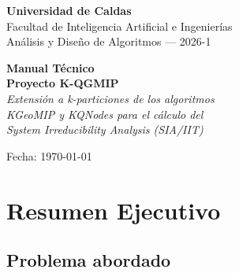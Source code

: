 \documentclass[11pt,letterpaper]{article}
\begin{document}
\begin{titlepage}
  \centering
  \vspace*{1cm}
  {\large \textbf{Universidad de Caldas}\\[0.3cm]
   Facultad de Inteligencia Artificial e Ingenierías\\[0.3cm]
   Análisis y Diseño de Algoritmos --- 2026-1}
  
  \vspace{3cm}
  {\Huge \textbf{Manual Técnico}}\\[0.5cm]
  {\LARGE \textbf{Proyecto K-QGMIP}}\\[0.8cm]
  {\large \textit{Extensión a k-particiones de los algoritmos\\
   KGeoMIP y KQNodes para el cálculo del\\
   System Irreducibility Analysis (SIA/IIT)}}
  
  \vspace{3cm}
  {\large Fecha: \today}
  
  \vfill
  \begin{abstract}
    Este manual describe el diseño, implementación y evaluación experimental
    del proyecto \textbf{K-QGMIP}: una extensión de los algoritmos GeoMIP y
    QNodes para encontrar la Minimum Information Partition (MIP) generalizada
    a $k$ grupos en redes con $n$ nodos. Se presentan los fundamentos
    matemáticos del System Irreducibility Analysis (SIA), la arquitectura del
    software, los algoritmos pseudocodificados, el análisis de complejidad
    asintótica y los resultados experimentales sobre matrices de transición
    de hasta $n=22$ nodos.
  \end{abstract}
\end{titlepage}

\tableofcontents
\newpage

\section{Resumen Ejecutivo}
\label{sec:resumen}

\subsection{Problema abordado}
\end{document}

